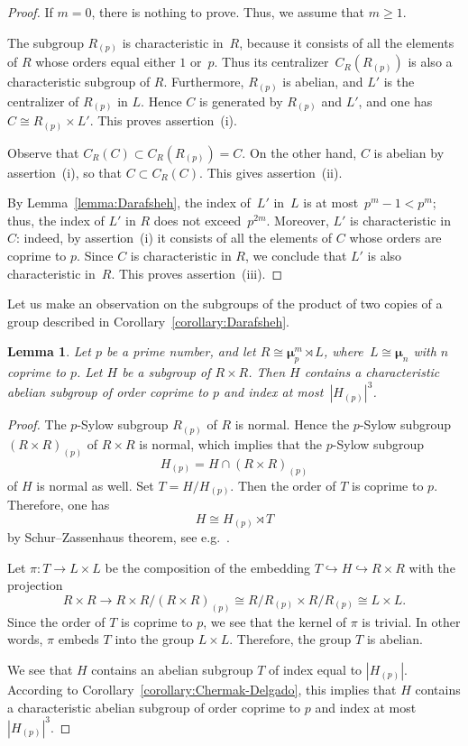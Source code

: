 \documentclass[12pt]{amsart}
\numberwithin{equation}{section}
\newtheorem{lemma}[subsection]{Lemma}
\theoremstyle{definition}
\newcommand{\mumu}{\boldsymbol{\mu}}
\def \ge {\geqslant}
\begin{document}
\begin{proof}
If $m=0$, there is nothing to prove. Thus, we assume that $m\ge 1$.

The subgroup $R_{(p)}$ is characteristic in~$R$,
because it consists of all the elements
of $R$ whose orders equal either $1$ or~$p$.
Thus its centralizer~$C_R(R_{(p)})$
is also a characteristic subgroup of $R$.
Furthermore, $R_{(p)}$ is abelian, and $L'$ is the centralizer of $R_{(p)}$ in $L$.
Hence $C$ is generated by $R_{(p)}$ and $L'$, and one has~\mbox{$C\cong R_{(p)}\times L'$}.
This proves assertion~(i).

Observe that $C_R(C)\subset C_R(R_{(p)})=C$. On the other hand, $C$ is abelian by assertion~(i),
so that $C\subset C_R(C)$.
This gives assertion~(ii).

By Lemma~\ref{lemma:Darafsheh}, the index of~$L'$ in~$L$
is at most~\mbox{$p^m-1<p^m$}; thus, the index of $L'$ in $R$
does not exceed~$p^{2m}$. Moreover, $L'$ is characteristic in $C$: indeed, by assertion~(i)
it consists of all the elements of $C$ whose orders are coprime to $p$.
Since $C$ is characteristic in $R$, we conclude that $L'$ is also characteristic in~$R$. This proves assertion~(iii).
\end{proof}

Let us make an observation on the subgroups of the product of two copies
of a group described in Corollary~\ref{corollary:Darafsheh}.

\begin{lemma}\label{lemma:Darafsheh-product}
Let $p$ be a prime number, and let $R\cong\mumu_p^m\rtimes L$,
where~\mbox{$L\cong \mumu_n$} with $n$ coprime to $p$.
Let $H$ be a subgroup of $R\times R$.
Then $H$ contains
a characteristic abelian subgroup of order coprime to $p$
and index at most~\mbox{$|H_{(p)}|^{3}$}.
\end{lemma}

\begin{proof}
The $p$-Sylow subgroup $R_{(p)}$ of $R$ is normal. Hence the
$p$-Sylow subgroup~\mbox{$(R\times R)_{(p)}$} of $R\times R$ is normal,
which implies that the $p$-Sylow subgroup
$$
H_{(p)}=H\cap (R\times R)_{(p)}
$$
of $H$ is normal as well. Set $T=H/H_{(p)}$.
Then the order of $T$ is coprime to $p$. Therefore,
one has
$$
H\cong H_{(p)}\rtimes T
$$
by Schur--Zassenhaus theorem, see e.g.~\mbox{\cite[Theorem~3.8]{Isaacs}}.

Let $\pi\colon T\to L\times L$ be the composition
of the embedding $T\hookrightarrow H\hookrightarrow R\times R$
with the projection
$$
R\times R\to R\times R/(R\times R)_{(p)}\cong R/R_{(p)}\times R/R_{(p)}\cong L\times L.
$$
Since the order of $T$ is coprime to $p$, we see that the kernel of $\pi$ is trivial.
In other words, $\pi$ embeds $T$ into the group $L\times L$. Therefore, the group $T$ is abelian.

We see that $H$ contains an abelian subgroup $T$ of index equal to $|H_{(p)}|$.
According to Corollary~\ref{corollary:Chermak-Delgado},
this implies that $H$ contains a characteristic abelian subgroup of order coprime to $p$
and index at most~\mbox{$|H_{(p)}|^{3}$}.
\end{proof}
\end{document}
